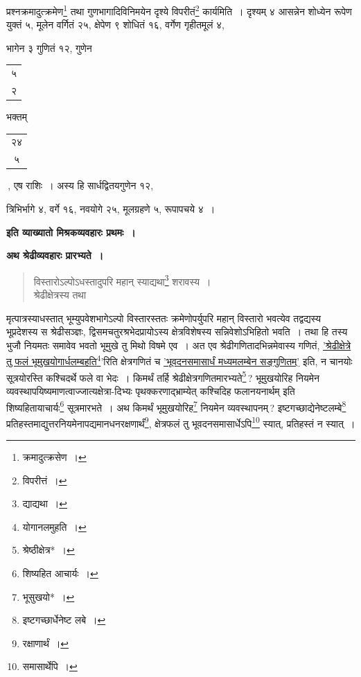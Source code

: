 \documentclass[10pt, openany]{book}
\begin{document}
{{प्रश्नक्रमादुत्क्रमेण\renewcommand{\thefootnote}{\s ६}\footnote{\s *क्रमादुत्क्रसेण~।} तथा गुणभागादिविनिमयेन दृश्ये विपरीतं\renewcommand{\thefootnote}{\s ७}\footnote{\s विपरीत्तं~।}
कार्यमिति~। दृश्यम् ४}
{आसन्नेन शोध्येन रूपेण युक्तं ५, मूलेन वर्गितं २५, क्षेपेण ९ शोधितं १६,
वर्गेण गृहीतमूलं ४,}
{भागेन ३ गुणितं १२, गुणेन \begin{tabular}{|c|}५ \\ २\\ \hline\end{tabular} भक्तम् \begin{tabular}{|c|}२४ \\ ५\\ \hline \end{tabular}\,, एष राशिः~। अस्य हि
सार्धद्वितयगुणेन १२,}
{त्रिभिर्भागे ४, वर्गे १६, नवयोगे २५, मूलग्रहणे ५, रूपापचये ४~।}
\vspace{2mm}

\begin{center}
\textbf{इति व्याख्यातो मिश्रकव्यवहारः प्रथमः~।}
\end{center}

\afterpage{\fancyhead[CO] {\s }}

\newpage

 \label{shre}
\begin{center}
\textbf{\large अथ श्रेढीव्यवहारः प्रारभ्यते~।}
\end{center}

\vspace{0.3cm}{तत्रादौ श्रेढीव्यवहारे श्रेढीस्वरूपं तावदाह\textemdash} 

\begin{quote}
{\bs विस्तारोऽल्पोऽधस्तादुपरि महान् स्याद्यथा\renewcommand{\thefootnote}{\s १}\footnote{\s द्याद्यथा~।} शरावस्य~।\\
 श्रेढीक्षेत्रस्य तथा}\end{quote}

{मृत्पात्रस्याधस्तात् भूम्युपवेशभागेऽल्पो विस्तारस्ततः क्रमेणोपर्युपरि
महान् विस्तारो}
{भवत्येव तद्वद्यस्य भूप्रदेशस्य स श्रेढीसञ्ज्ञः,
द्विसमचतुरश्रभेदप्रायोऽस्य क्षेत्रविशेषस्य सन्निवेशोऽभिहितो भवति~। तथा हि तस्य भुजौ नियमतः समावेव भवतो भूमुखे तु मिथो विषमे एव~।}
{अत एव श्रेढीगणितादभिन्नमेवास्य गणितं, \hyperref[85]{'श्रेढीक्षेत्रे तु फलं
भूमुखयोगार्धलम्बहति\renewcommand{\thefootnote}{\s २}\footnote{\s *योगानलमुहति~।}'}रिति}
{क्षेत्रगणितं च \hyperref[115]{'भूवदनसमासार्धं मध्यमलम्बेन सङ्गुणितम्'} इति, न चानयोः
सूत्रयोरस्ति}
{कश्चिदर्थे फले वा भेदः~। किमर्थं तर्हि श्रेढीक्षेत्रगणितमारभ्यते\renewcommand{\thefootnote}{\s ३}\footnote{\s श्रेष्ठीक्षेत्र*~।}\,?
भूमुखयोरिह नियमेन}
{व्यवस्थापयिष्यमाणत्वाज्जात्यक्षेत्रा-दिभ्यः
पृथक्करणाद्भ्राम्येत् कश्चिदिह फलानयनार्थम् इति}
{शिष्यहितायाचार्यः\renewcommand{\thefootnote}{\s ४}\footnote{\s शिष्यहित आचार्यः~।} सूत्रमारभते~। अथ किमर्थं भूमुखयोरिह\renewcommand{\thefootnote}{\s ५}\footnote{\s भूसुखयो*~।} नियमेन
व्यवस्थापनम्\,?}
{इष्टगच्छाद्येनेष्टलम्बे\renewcommand{\thefootnote}{\s ६}\footnote{\s इष्टगच्छार्धेनेष्ट लबे~।}
प्रतिहस्तमाद्युत्तरनियमेनापद्यमानधनरक्षणार्थं\renewcommand{\thefootnote}{\s ७}\footnote{\s *रक्षाणार्थं~।}, क्षेत्रफलं तु
भूवदनसमासार्धेऽपि\renewcommand{\thefootnote}{\s ८}\footnote{\s *समासार्थेपि~।} स्यात्, प्रतिहस्तं न स्यात्~।}
\vspace{0.3cm}

}
\end{document}
